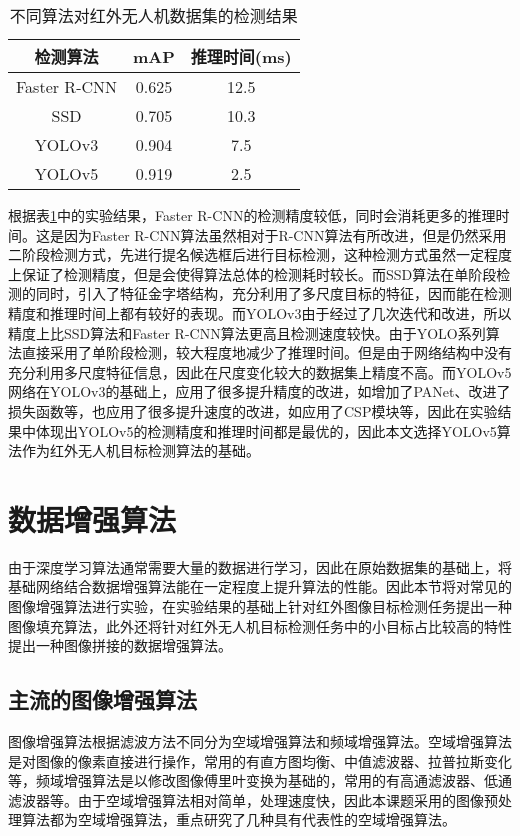 \begin{table}[htbp]
  \caption{不同算法对红外无人机数据集的检测结果}
  \vspace{0.5em}\centering\wuhao
  \begin{tabular}{ccc}
  \toprule
  检测算法 & mAP & 推理时间(ms)\\
  \midrule
  Faster R-CNN & 0.625 & 12.5\\
  SSD & 0.705 & 10.3\\
  YOLOv3 & 0.904 & 7.5\\
  YOLOv5 & 0.919 & 2.5\\
  \bottomrule
  \end{tabular}
  \label{t11}
\end{table}

根据表\ref{t11}中的实验结果，Faster R-CNN的检测精度较低，同时会消耗更多的推理时间。这是因为Faster R-CNN算法虽然相对于R-CNN算法有所改进，但是仍然采用二阶段检测方式，先进行提名候选框后进行目标检测，这种检测方式虽然一定程度上保证了检测精度，但是会使得算法总体的检测耗时较长。而SSD算法在单阶段检测的同时，引入了特征金字塔结构，充分利用了多尺度目标的特征，因而能在检测精度和推理时间上都有较好的表现。而YOLOv3由于经过了几次迭代和改进，所以精度上比SSD算法和Faster R-CNN算法更高且检测速度较快。由于YOLO系列算法直接采用了单阶段检测，较大程度地减少了推理时间。但是由于网络结构中没有充分利用多尺度特征信息，因此在尺度变化较大的数据集上精度不高。而YOLOv5网络在YOLOv3的基础上，应用了很多提升精度的改进，如增加了PANet、改进了损失函数等，也应用了很多提升速度的改进，如应用了CSP模块等，因此在实验结果中体现出YOLOv5的检测精度和推理时间都是最优的，因此本文选择YOLOv5算法作为红外无人机目标检测算法的基础。

\section{数据增强算法}
由于深度学习算法通常需要大量的数据进行学习，因此在原始数据集的基础上，将基础网络结合数据增强算法能在一定程度上提升算法的性能。因此本节将对常见的图像增强算法进行实验，在实验结果的基础上针对红外图像目标检测任务提出一种图像填充算法，此外还将针对红外无人机目标检测任务中的小目标占比较高的特性提出一种图像拼接的数据增强算法。

\subsection{主流的图像增强算法}
图像增强算法根据滤波方法不同分为空域增强算法和频域增强算法。空域增强算法是对图像的像素直接进行操作，常用的有直方图均衡、中值滤波器、拉普拉斯变化等，频域增强算法是以修改图像傅里叶变换为基础的，常用的有高通滤波器、低通滤波器等。由于空域增强算法相对简单，处理速度快，因此本课题采用的图像预处理算法都为空域增强算法，重点研究了几种具有代表性的空域增强算法。

